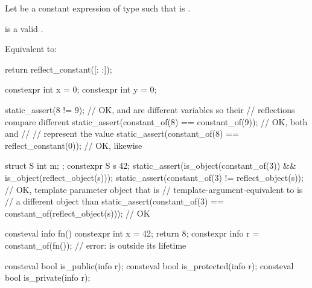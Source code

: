 \begin{itemdescr}
\pnum
Let  be a constant expression of type 
such that  is .

\pnum
\constantwhen
\tcode{[: \placeholder{R} :]} is a valid
.

\pnum
\effects
Equivalent to:
\begin{codeblock}
return reflect_constant([:  :]);
\end{codeblock}
\begin{example}
\begin{codeblock}
constexpr int x = 0;
constexpr int y = 0;

static_assert(^^x != ^^y);                              // OK,  and  are different variables so their
                                                        // reflections compare different
static_assert(constant_of(^^x) == constant_of(^^y));    // OK, both  and
                                                        // 
                                                        // represent the value 
static_assert(constant_of(^^x) == reflect_constant(0)); // OK, likewise

struct S { int m; };
constexpr S s {42};
static_assert(is_object(constant_of(^^s)) &&
              is_object(reflect_object(s)));
static_assert(constant_of(^^s) != reflect_object(s));   // OK, template parameter object that is
                                                        // template-argument-equivalent to  is
                                                        // a different object than 
static_assert(constant_of(^^s) ==
              constant_of(reflect_object(s)));          // OK

consteval info fn() {
  constexpr int x = 42;
  return ^^x;
}
constexpr info r = constant_of(fn());                   // error:  is outside its lifetime
\end{codeblock}
\end{example}
\end{itemdescr}

%
%
%
\begin{itemdecl}
consteval bool is_public(info r);
consteval bool is_protected(info r);
consteval bool is_private(info r);
\end{itemdecl}

